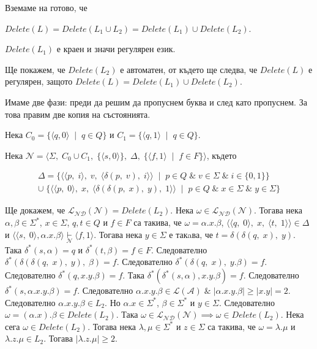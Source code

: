 \documentclass[12pt]{article}
\begin{document}
Вземаме на готово, че

\(Delete(L) = Delete(L_1 \cup L_2) = Delete(L_1) \cup Delete(L_2)\).

\(Delete(L_1)\) е краен и значи регулярен език.

Ще покажем, че \(Delete(L_2)\) е автоматен, от където ще следва, че \(Delete(L)\) е регулярен, защото \(Delete(L) = Delete(L_1) \cup Delete(L_2)\).

Имаме две фази: преди да решим да пропуснем буква и след като пропуснем. За това правим две копия на състоянията.

Нека \(C_0 = \{\langle q, 0 \rangle \;\mid\; q \in Q\}\) и \(C_1 = \{\langle q, 1 \rangle \;\mid\; q \in Q\}\).

Нека \(\mathcal{N} = \langle \Sigma,\; C_0 \cup C_1,\; \{\langle s, 0 \rangle\},\; \Delta,\; \{\langle f, 1\rangle \;\mid\; f \in F\} \rangle\), където

\begin{align*}
    \Delta = \{ \langle \langle p,\; i \rangle,\; v,\; \langle \delta(p,\; v),\; i \rangle \rangle \;\mid\; p \in Q \;\&\; v \in \Sigma \;\&\; i \in \{0, 1\} \} \\
    \cup \; \{ \langle \langle p,\; 0 \rangle,\; x,\; \langle \delta(\delta(p,\; x),\; y),\; 1 \rangle \rangle \;\mid\; p \in Q \;\&\; x \in \Sigma \;\&\; y \in \Sigma \}
\end{align*}

Ще докажем, че \(\mathcal{L_{ND}}(\mathcal{N}) = Delete(L_2)\).
Нека \(\omega \in \mathcal{L_{ND}}(\mathcal{N})\). Тогава нека \(\alpha, \beta \in \Sigma^*\), \(x \in \Sigma\), \(q, t \in Q\) и \(f \in F\) са такива, че \(\omega = \alpha.x.\beta\), \(\langle \langle q,\; 0 \rangle,\; x,\; \langle t,\; 1 \rangle \rangle \in \Delta\) и \(\langle \langle s,\; 0 \rangle, \alpha.x.\beta \rangle \underset{\mathcal{N}}{\vdash} \langle f, 1 \rangle\).
Тогава нека \(y \in \Sigma\) е такaва, че \(t = \delta(\delta(q,\; x),\; y)\).
Така \(\delta^*(s, \alpha) = q\) и \(\delta^*(t, \beta) = f \in F\). Следователно \(\delta^*(\delta(\delta(q,\; x),\; y),\; \beta) = f\).
Следователно \(\delta^*(\delta(q,\; x),\; y.\beta) = f\). Следователно \(\delta^*(q, x.y.\beta) = f\).
Така \(\delta^*(\delta^*(s, \alpha), x.y.\beta) = f\). Следователно \(\delta^*(s, \alpha.x.y.\beta) = f\).
Следователно \(\alpha.x.y.\beta \in \mathcal{L}(\mathcal{A}) \;\&\; |\alpha.x.y.\beta| \geq |x.y| = 2\).
Следователно \(\alpha.x.y.\beta \in L_2\).
Но \(\alpha.x \in \Sigma^*\), \(\beta \in \Sigma^*\) и \(y \in \Sigma\). Следователно \(\omega = (\alpha.x).\beta \in Delete(L_2)\).
Така \(\omega \in \mathcal{L_{ND}}(\mathcal{N}) \implies \omega \in Delete(L_2)\).
Нека сега \(\omega \in Delete(L_2)\). Тогава нека \(\lambda, \mu \in \Sigma^*\) и \(z \in \Sigma\) са такива, че \(\omega = \lambda.\mu\) и \(\lambda.z.\mu \in L_2\). Тогава \(|\lambda.z.\mu| \geq 2\).
\end{document}
